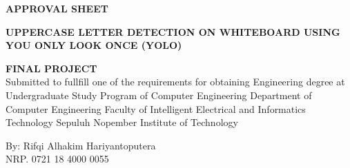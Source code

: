 \begin{center}
	\large
  \textbf{APPROVAL SHEET}
\end{center}

\thispagestyle{empty}

\begin{center}
  \textbf{UPPERCASE LETTER DETECTION ON WHITEBOARD USING YOU ONLY LOOK ONCE (YOLO)}
\end{center}

\begingroup
  \small
  

  \begin{center}
    \textbf{FINAL PROJECT}
    \\Submitted to fullfill one of the requirements for obtaining Engineering degree at Undergraduate Study Program of Computer Engineering Department of Computer Engineering Faculty of Intelligent Electrical and Informatics Technology Sepuluh Nopember Institute of Technology
  \end{center}


  \begin{center}
    By: Rifqi Alhakim Hariyantoputera 
    \\NRP. 0721 18 4000 0055
  \end{center}



